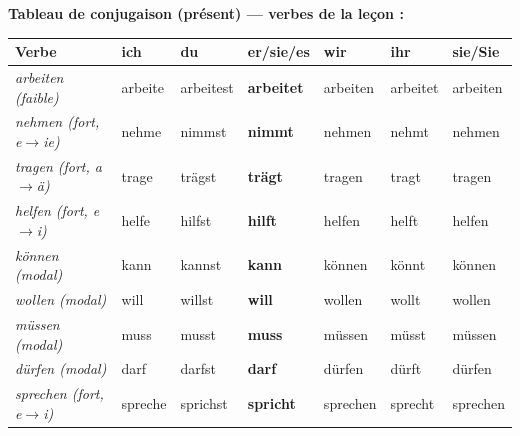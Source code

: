 \documentclass[11pt]{article}
\newcommand{\all}[1]{\ifmmode\text{\textit{#1}}\else\begingroup\selectlanguage{ngerman}\itshape #1\endgroup\fi}
\begin{document}
\begin{corrige}[Exercice 4]
\textbf{Tableau de conjugaison (présent) — verbes de la leçon :}
\begin{center}
\begin{tabular}{|l|l|l|l|l|l|l|}
\hline
\rowcolor{popblueL} \textbf{Verbe} & \textbf{ich} & \textbf{du} & \textbf{er/sie/es} & \textbf{wir} & \textbf{ihr} & \textbf{sie/Sie} \\ \hline
\all{arbeiten} (faible) & arbeite & arbeitest & \textbf{arbeitet} & arbeiten & arbeitet & arbeiten \\ \hline
\all{nehmen} (fort, e$\rightarrow$ie) & nehme & nimmst & \textbf{nimmt} & nehmen & nehmt & nehmen \\ \hline
\all{tragen} (fort, a$\rightarrow$ä) & trage & trägst & \textbf{trägt} & tragen & tragt & tragen \\ \hline
\all{helfen} (fort, e$\rightarrow$i) & helfe & hilfst & \textbf{hilft} & helfen & helft & helfen \\ \hline
\all{können} (modal) & kann & kannst & \textbf{kann} & können & könnt & können \\ \hline
\all{wollen} (modal) & will & willst & \textbf{will} & wollen & wollt & wollen \\ \hline
\all{müssen} (modal) & muss & musst & \textbf{muss} & müssen & müsst & müssen \\ \hline
\all{dürfen} (modal) & darf & darfst & \textbf{darf} & dürfen & dürft & dürfen \\ \hline
\all{sprechen} (fort, e$\rightarrow$i) & spreche & sprichst & \textbf{spricht} & sprechen & sprecht & sprechen \\ \hline
\end{tabular}
\end{center}
\end{corrige}
\end{document}

